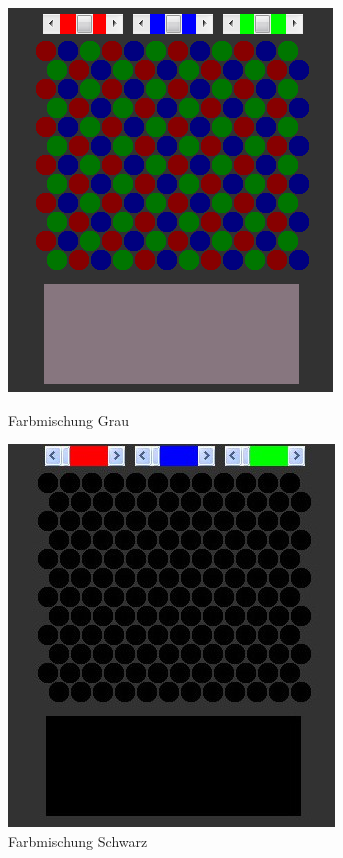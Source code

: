 \documentclass[a4paper]{article}
\begin{document}
\begin{figure}[H]
    \centering
    \begin{minipage}[b]{0.45\textwidth}
    	\includegraphics[width=0.89\columnwidth]{images/A3_grau.PNG}
    	\caption{Farbmischung Grau}
    	\centering
    	\label{fig:a3_grau}
    \end{minipage}
    \hfill
    \begin{minipage}[b]{0.45\textwidth}
    	\includegraphics[width=0.9\columnwidth]{images/A3_schwarz.jpg}
    	\centering
    	\caption{Farbmischung Schwarz}
    	\label{fig:a3_schwarz}
    \end{minipage}
    \hfill
\end{figure}
\end{document}
